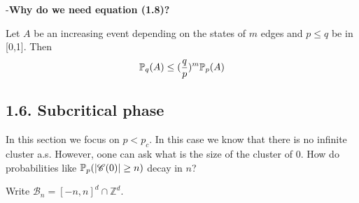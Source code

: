 \documentclass[10pt,a4paper]{report}
\begin{document}
-\textbf{Why do we need equation (1.8)?}
\s

 Let $A$ be an increasing event depending on the states of $m$ edges and $p\leq q$ be in [0,1]. Then
\begin{align*}
\mathbb{P}_q(A) \leq (\frac{q}{p})^m \mathbb{P}_p(A)
\end{align*}

\subsection*{1.6. Subcritical phase}

In this section we focus on $p<p_c$. In this case we know that there is no infinite cluster a.s. However, oone can ask what is the size of the cluster of 0. How do probabilities like $\mathbb{P}_p(|\mathscr{C}(0)| \geq n)$ decay in $n$?

Write $\mathscr{B}_n = [-n,n]^d \cap \mathbb{Z}^d$.
\s
\end{document}
